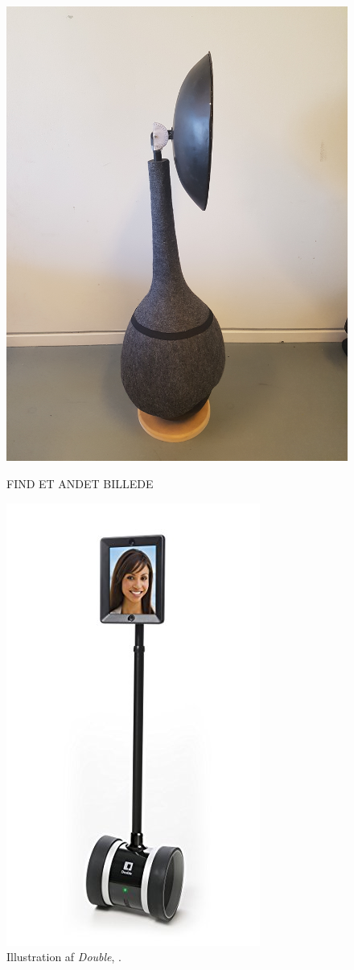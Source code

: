 \begin{figure}[H]
\centering
\begin{minipage}{.5\textwidth}
  \centering
  \includegraphics[width=.8\linewidth, angle =-90]{Figure/TEST.jpg}
  \caption{FIND ET ANDET BILLEDE}
  \label{fig:VoresRobot}
\end{minipage}%
\begin{minipage}{.5\textwidth}
  \centering
  \includegraphics[width=.48\linewidth]{Figure/Double}
  \caption{Illustration af \textit{Double}, \parencite{WEB:Double}.}
  \label{fig:Double}
\end{minipage}
\end{figure}
